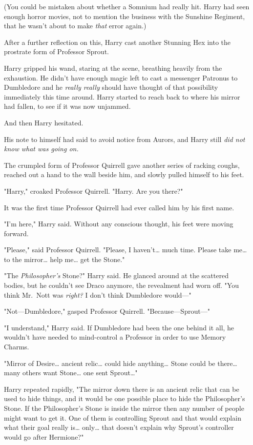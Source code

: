 (You could be mistaken about whether a Somnium had really hit. Harry had seen 
enough horror movies, not to mention the business with the Sunshine Regiment, 
that he wasn't about to make \emph{that} error again.)

After a further reflection on this, Harry cast another Stunning Hex into the 
prostrate form of Professor Sprout.

Harry gripped his wand, staring at the scene, breathing heavily from the 
exhaustion. He didn't have enough magic left to cast a messenger Patronus to 
Dumbledore and he \emph{really really} should have thought of that possibility 
immediately this time around. Harry started to reach back to where his mirror 
had fallen, to see if it was now unjammed.

And then Harry hesitated.

His note to himself had said to avoid notice from Aurors, and Harry still 
\emph{did not know what was going on.}

The crumpled form of Professor Quirrell gave another series of racking coughs, 
reached out a hand to the wall beside him, and slowly pulled himself to his 
feet.

"Harry," croaked Professor Quirrell. "Harry. Are you there?"

It was the first time Professor Quirrell had ever called him by his first name.

"I'm here," Harry said. Without any conscious thought, his feet were moving 
forward.

"Please," said Professor Quirrell. "Please, I haven't{\ldots} much time. Please 
take me{\ldots} to the mirror{\ldots} help me{\ldots} get the Stone."

"The \emph{Philosopher's} Stone?" Harry said. He glanced around at the 
scattered bodies, but he couldn't see Draco anymore, the revealment had worn 
off. "You think Mr.~Nott was \emph{right?} I don't think Dumbledore would---"

"Not---Dumbledore," gasped Professor Quirrell. "Because---Sprout---"

"I understand," Harry said. If Dumbledore had been the one behind it all, he 
wouldn't have needed to mind-control a Professor in order to use Memory Charms.

"Mirror of Desire{\ldots} ancient relic{\ldots} could hide anything{\ldots} 
Stone could be there{\ldots} many others want Stone{\ldots} one sent 
Sprout{\ldots}"

Harry repeated rapidly, "The mirror down there is an ancient relic that can be 
used to hide things, and it would be one possible place to hide the 
Philosopher's Stone. If the Philosopher's Stone is inside the mirror then any 
number of people might want to get it. One of them is controlling Sprout and 
that would explain what their goal really is{\ldots} only{\ldots} that doesn't 
explain why Sprout's controller would go after Hermione?"

